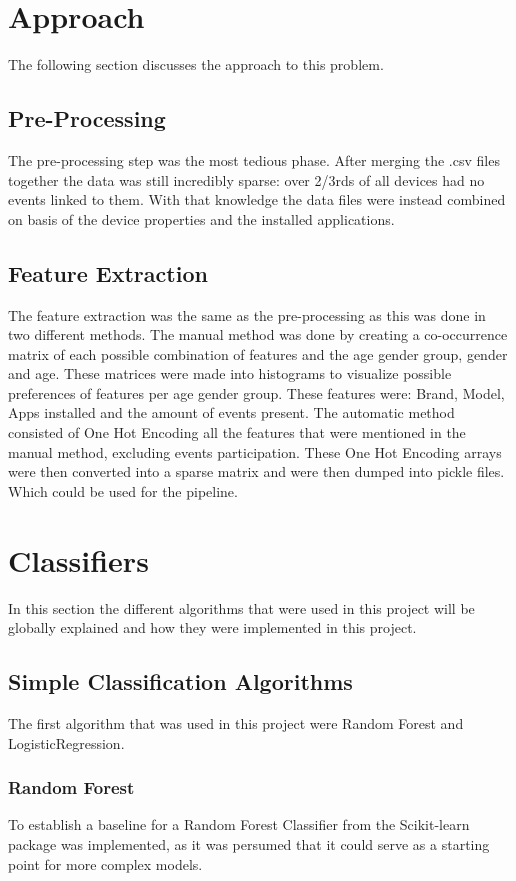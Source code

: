 \documentclass[runningheads,a4paper]{llncs}
\begin{document}
\section{Approach}
The following section discusses the approach to this problem. 
\subsection{Pre-Processing}
The pre-processing step was the most tedious phase. After merging the .csv files together the data was still incredibly sparse: over 2/3rds of all devices had no events linked to them. With that knowledge the data files were instead combined on basis of the device properties and the installed applications. 
\subsection{Feature Extraction}
The feature extraction was the same as the pre-processing as this was done in two different methods. 
\medskip
The manual method was done by creating a co-occurrence matrix of each possible combination of features and the age gender group, gender and age. These matrices were made into histograms to visualize possible preferences of features per age gender group. These features were: Brand, Model, Apps installed and the amount of events present.
\medskip
The automatic method consisted of One Hot Encoding all the features that were mentioned in the manual method, excluding events participation\cite{OHC}. These One Hot Encoding arrays were then converted into a sparse matrix and were then dumped into pickle files. Which could be used for the pipeline. 

\section{Classifiers}
In this section the different algorithms that were used in this project will be globally explained and how they were implemented in this project. 

\subsection{Simple Classification Algorithms}
The first algorithm that was used in this project were Random Forest and LogisticRegression. 
\subsubsection{Random Forest}
To establish a baseline for a Random Forest Classifier from the Scikit-learn package was implemented, as it was persumed that it could serve as a starting point for more complex models. 
\end{document}
